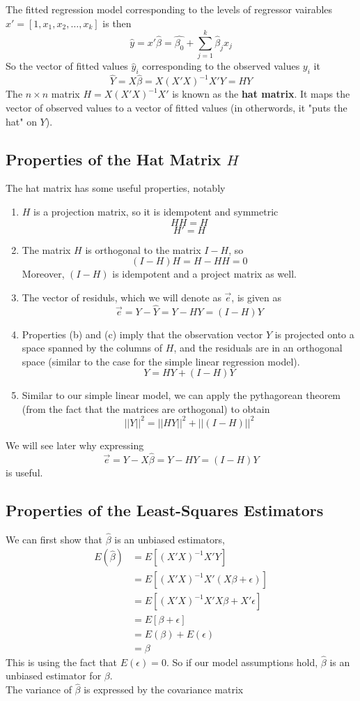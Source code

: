 The fitted regression model corresponding to the levels of regressor vairables $x' = [1, x_1, x_2,\ldots, x_k]$ is then 
\[\hat{y} = x'\hat{\beta} = \hat{\beta_0} + \sum_{j=1}^k\hat{\beta}_jx_j\]
So the vector of fitted values $\hat{y}_i$ corresponding to the observed values $y_i$ it
\[\hat{Y} = X\hat{\beta} = X(X'X)^{-1}X'Y = HY\]
The $n \times n$ matrix $H = X(X'X)^{-1}X'$ is known as the \textbf{hat matrix}. It maps the vector of observed values to a vector of fitted values (in otherwords, it "puts the hat" on $Y$). 
\subsection{Properties of the Hat Matrix $H$}
The hat matrix has some useful properties, notably
\begin{enumerate}[label=(\alph*)]
    \item $H$ is a projection matrix, so it is idempotent and symmetric
    \[HH = H\]
    \[H' = H\]
    \item The matrix $H$ is orthogonal to the matrix $I - H$, so 
    \[(I - H)H = H - HH = 0\]
    Moreover, $(I-H)$ is idempotent and a project matrix as well.
    \item The vector of residuls, which we will denote as $\vec{e}$, is given as 
    \[\vec{e} = Y - \hat{Y} = Y - HY = (I-H)Y\]
    \item Properties (b) and (c) imply that the observation vector $Y$ is projected onto a space spanned by the columns of $H$, and the residuals are in an orthogonal space (similar to the case for the simple linear regression model).
    \[Y = HY + (I-H)Y\]
    \item Similar to our simple linear model, we can apply the pythagorean theorem (from the fact that the matrices are orthogonal) to obtain 
    \[||Y||^2 = ||HY||^2 + ||(I-H)||^2\]
\end{enumerate}
We will see later why expressing 
\[\vec{e} = Y - X\hat{\beta} = Y - HY = (I-H)Y\]
is useful.

\subsection{Properties of the Least-Squares Estimators}

We can first show that $\hat{\beta}$ is an unbiased estimators, 
\begin{align*}
    E(\hat{\beta}) &= E\left[(X'X)^{-1}X'Y\right]\\
                   &= E\left[(X'X)^{-1}X'(X\beta + \epsilon)\right]\\
                   &= E\left[(X'X)^{-1}X'X\beta + X'\epsilon\right]\\
                   &= E\left[\beta + \epsilon\right]\\
                   &= E(\beta) + E(\epsilon)\\
                   &= \beta
\end{align*}
This is using the fact that $E(\epsilon) = 0$. So if our model assumptions hold, $\hat{\beta}$ is an unbiased estimator for $\beta$.\\
The variance of $\hat{\beta}$ is expressed by the covariance matrix

